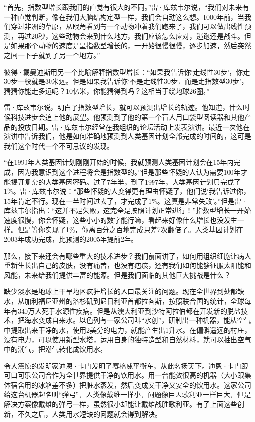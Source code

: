 “首先，指数型增长跟我们的直觉有很大的不同。”雷·库兹韦尔说，“我们对未来有一种直觉判断，像在我们大脑结构定型一样，我们会自动这么想。1000年前，当我们穿过非洲的草原，从眼角看到有一个动物冲着我们跑来了，我们可以做出线性预测，再过20秒，这些动物会来到什么地方，我们应该怎么应对，逃跑还是战斗。但是如果那个动物的速度是呈指数型增长的，一开始很慢很慢，逐步加速，然后突然之间一下子就到了另一个地方。”

彼得·戴曼迪斯用另一个比喻解释指数型增长：“如果我告诉你‘走线性30步’，你走30步一般就是30米远。但是如果我告诉你‘不是走线性30步，而是走指数型30步’，猜猜你能走多远呢？10亿米，你能猜得到吗？这相当于绕地球26圈。”

雷·库兹韦尔说，明白了指数型增长，就可以预测出增长的轨迹。他知道，什么时候科技进步会追上他的展望。他预测到了他的第一个盲人用口袋型阅读器和其他产品的投放日期。雷·库兹韦尔经常在我组织的论坛活动上发表演讲。最近一次他在演讲中告诉我们，他是如何准确地预测到人类基因计划全部完成的时间的，这可是我们这个时代一个不可思议的发现。

“在1990年人类基因计划刚刚开始的时候，我就预测人类基因计划会在15年内完成，因为我意识到这个进程将会是指数型的。”但是那些怀疑的人认为需要100年才能揭开复杂的人类基因密码。过了7年半，到了1997年，人类基因计划只完成了1\%。雷·库兹韦尔说：“那些怀疑的人变得更有理由怀疑了，他们说‘我告诉过你，15年肯定不行。现在一半时间过去了，才完成了1\%。这真是非常失败’。”但是雷·库兹韦尔指出：“这并不是失败，这完全是按照计划正常进行！”指数型增长一开始速度很慢，你会怀疑，这些小小的数字能行嘛，看起来好像什么增长也没发生一样。但是等你实现了1\%，你离百分之百地完成只差7次翻倍了。人类基因计划在2003年成功完成，比预测的2005年提前2年。

那么，接下来还会有哪些重大的技术进步？我们前面讲了，如何用组织细胞让病人重新生长出自己的皮肤，没有痛苦，也没有疤痕，还有我们如何能够征服太阳能和风能，未来给我们提供丰富的能源。但是我们面临的其他巨大挑战是什么？

缺少淡水是地球上干旱地区疯狂增长的人口最关注的问题。现在全世界到处都缺水，从加利福尼亚州的洛杉矶到尼日利亚首都拉各斯，按照联合国的统计，全球每年有340万人死于水源性疾病。但是从澳大利亚到沙特阿拉伯都在开发新的脱盐技术，把海水变成自来水。以色列有一家公司叫“水创”，研制出一种机器，能从空气中提取出来干净的水，使用2美分的电力，就能产生出1升水。在偏僻遥远的村庄，没有电力，可以使用新型水塔，运用自身的独特造型和自然材料，就可以抽出空气中的潮气，把潮气转化成饮用水。

令人震惊的发明家迪恩·卡门发明了赛格威平衡车，从此名扬天下。迪恩·卡门跟可口可乐公司合作为全世界提供干净的饮用水。用一台能效很高的机器（大小跟集体宿舍用的冰箱差不多）把脏水蒸发，然后变成又干净又安全的饮用水。这家公司给这台机器起名叫“弹弓”，人类像戴维一样小，问题像巨人歌利亚一样巨大，但是解决方案像戴维的弹弓一样，虽然很小却能让戴维战胜歌利亚。有了上面这些创新，不久之后，人类用水短缺的问题就会得到解决。

